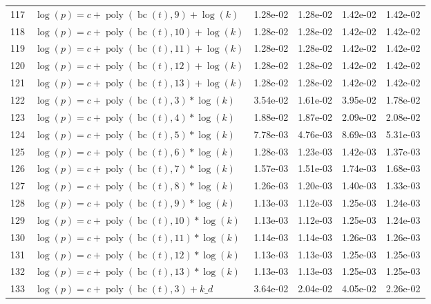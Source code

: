 \documentclass[12pt,a4paper]{article}
\DeclareMathOperator{\bc}{bc}
\DeclareMathOperator{\poly}{poly}
\begin{document}
\begin{longtable}[t]{ll>{\raggedleft\arraybackslash}p{2cm}>{\raggedleft\arraybackslash}p{2cm}>{\raggedleft\arraybackslash}p{2cm}>{\raggedleft\arraybackslash}p{2cm}}
\rowcolor{gray!6}  117 & $\log(p) = c + \poly\left( \bc(t), 9 \right) + \log(k)$ & 1.28e-02 & 1.28e-02 & 1.42e-02 & 1.42e-02\\
118 & $\log(p) = c + \poly\left( \bc(t), 10 \right) + \log(k)$ & 1.28e-02 & 1.28e-02 & 1.42e-02 & 1.42e-02\\
\rowcolor{gray!6}  119 & $\log(p) = c + \poly\left( \bc(t), 11 \right) + \log(k)$ & 1.28e-02 & 1.28e-02 & 1.42e-02 & 1.42e-02\\
120 & $\log(p) = c + \poly\left( \bc(t), 12 \right) + \log(k)$ & 1.28e-02 & 1.28e-02 & 1.42e-02 & 1.42e-02\\
\rowcolor{gray!6}  121 & $\log(p) = c + \poly\left( \bc(t), 13 \right) + \log(k)$ & 1.28e-02 & 1.28e-02 & 1.42e-02 & 1.42e-02\\
122 & $\log(p) = c + \poly\left( \bc(t), 3 \right) * \log(k)$ & 3.54e-02 & 1.61e-02 & 3.95e-02 & 1.78e-02\\
\rowcolor{gray!6}  123 & $\log(p) = c + \poly\left( \bc(t), 4 \right) * \log(k)$ & 1.88e-02 & 1.87e-02 & 2.09e-02 & 2.08e-02\\
124 & $\log(p) = c + \poly\left( \bc(t), 5 \right) * \log(k)$ & 7.78e-03 & 4.76e-03 & 8.69e-03 & 5.31e-03\\
\rowcolor{gray!6}  125 & $\log(p) = c + \poly\left( \bc(t), 6 \right) * \log(k)$ & 1.28e-03 & 1.23e-03 & 1.42e-03 & 1.37e-03\\
126 & $\log(p) = c + \poly\left( \bc(t), 7 \right) * \log(k)$ & 1.57e-03 & 1.51e-03 & 1.74e-03 & 1.68e-03\\
\rowcolor{gray!6}  127 & $\log(p) = c + \poly\left( \bc(t), 8 \right) * \log(k)$ & 1.26e-03 & 1.20e-03 & 1.40e-03 & 1.33e-03\\
128 & $\log(p) = c + \poly\left( \bc(t), 9 \right) * \log(k)$ & 1.13e-03 & 1.12e-03 & 1.25e-03 & 1.24e-03\\
\rowcolor{gray!6}  129 & $\log(p) = c + \poly\left( \bc(t), 10 \right) * \log(k)$ & 1.13e-03 & 1.12e-03 & 1.25e-03 & 1.24e-03\\
130 & $\log(p) = c + \poly\left( \bc(t), 11 \right) * \log(k)$ & 1.14e-03 & 1.14e-03 & 1.26e-03 & 1.26e-03\\
\rowcolor{gray!6}  131 & $\log(p) = c + \poly\left( \bc(t), 12 \right) * \log(k)$ & 1.13e-03 & 1.13e-03 & 1.25e-03 & 1.25e-03\\
132 & $\log(p) = c + \poly\left( \bc(t), 13 \right) * \log(k)$ & 1.13e-03 & 1.13e-03 & 1.25e-03 & 1.25e-03\\
\rowcolor{gray!6}  133 & $\log(p) = c + \poly\left( \bc(t), 3 \right) + k\_d$ & 3.64e-02 & 2.04e-02 & 4.05e-02 & 2.26e-02\\

\end{longtable}
\end{document}

